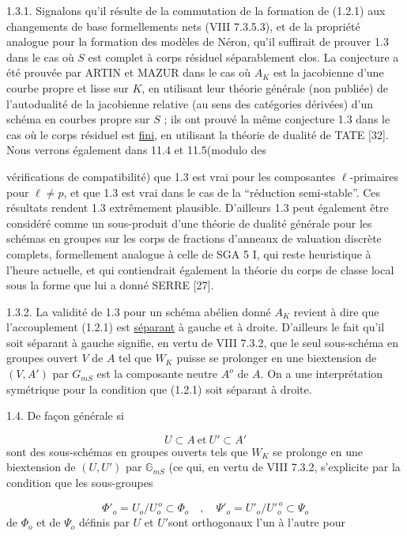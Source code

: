 1.3.1. Signalons qu'il résulte de la commutation de la formation de (1.2.1) aux changements de base formellements nets (VIII 7.3.5.3), et de la propriété analogue pour la formation des modèles de Néron, qu'il suffirait de prouver 1.3 dans le cas où $S$ est complet à corps résiduel séparablement clos. La conjecture a été prouvée par ARTIN et MAZUR dans le cas où $A_K$ est la jacobienne d'une courbe propre et lisse sur $K$, en utilisant leur théorie générale (non publiée) de l'autodualité de la jacobienne relative (au sens des catégories dérivées) d'un schéma en courbes propre sur $S$ ; ils ont prouvé la même conjecture 1.3 dans le cas où le corps résiduel est \underline{fini}, en utilisant la théorie de dualité de TATE [32]. Nous verrons également dans 11.4 et 11.5(modulo des



vérifications de compatibilité) que 1.3 est vrai pour les composantes $\ell$-primaires pour $\ell \neq p$, et que 1.3 est vrai dans le cas de la ``réduction semi-stable''. Ces résultats rendent 1.3 extrêmement plausible. D'ailleurs 1.3 peut également être considéré comme un sous-produit d'une théorie de dualité générale pour les schémas en groupes sur les corps de fractions d'anneaux de valuation discrète complets, formellement analogue à celle de SGA 5 I, qui reste heuristique à l'heure actuelle, et qui contiendrait également la théorie du corps de classe local sous la forme que lui a donné SERRE [27].

1.3.2. La validité de 1.3 pour un schéma abélien donné $A_K$ revient à dire que l'accouplement (1.2.1) est \underline{séparant} à gauche et à droite. D'ailleurs le fait qu'il soit séparant à gauche signifie, en vertu de VIII 7.3.2, que le seul sous-schéma en groupes ouvert $V$ de $A$ tel que $W_K$ puisse se prolonger en une biextension de $(V,A')$ par $G_{mS}$ est la composante neutre $A^o$ de $A$. On a une interprétation symétrique pour la condition que (1.2.1) soit séparant à droite.

1.4. De façon générale si

\begin{equation}\tag{1.4.1}
U \subset A \ \mbox{et} \ U' \subset A'
\end{equation}
sont des sous-schémas en groupes ouverts tels que $W_K$ se prolonge en une biextension de $(U,U')$ par $\mathbb{G}_{mS}$ (ce qui, en vertu de VIII 7.3.2, s'explicite par la condition que les sous-groupes

\begin{equation}\tag{1.4.2}
\Phi'_o = U_o/U_o^{\,o} \subset \Phi_o \quad , \quad \Psi'_o = {U'}_o/{U'}_o^{\,o} \subset \Psi_o
\end{equation}
de $\Phi_o$ et de $\Psi_o$ définis par $U$ et $U'$sont orthogonaux l'un à l'autre pour


